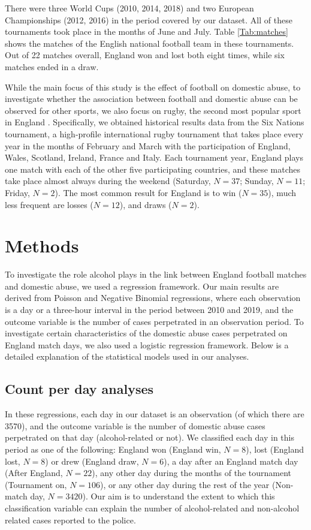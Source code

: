 \documentclass[12pt, a4paper]{article}
\begin{document}
 There were three World Cups (2010, 2014, 2018) and two European Championships (2012, 2016) in the period covered by our dataset. All of these tournaments took place in the months of June and July. 
Table \ref{Tab:matches} shows the matches of the English national football team in these tournaments. Out of 22 matches overall, England won and lost both eight times, while six matches ended in a draw. 

While the main focus of this study is the effect of football on domestic abuse, to investigate whether the association between football and domestic abuse can be observed for other sports, we also focus on rugby, the second most popular sport in England \cite{Ipsos2003}. Specifically, we obtained historical results data from the Six Nations tournament, a high-profile international rugby tournament that takes place every year in the months of February and March with the participation of England, Wales, Scotland, Ireland, France and Italy. Each tournament year, England plays one match with each of the other five participating countries, and these matches take place almost always during the weekend (Saturday, $N = 37$; Sunday, $N = 11$; Friday, $N = 2$). The most common result for England is to win ($N = 35$), much less frequent are losses ($N = 12$), and draws ($N = 2$).

\section{Methods}


To investigate the role alcohol plays in the link between England football matches and domestic abuse, we used a regression framework. Our main results are derived from Poisson and Negative Binomial regressions, where each observation is a day or a three-hour interval in the period between 2010 and 2019, and the outcome variable is the number of cases perpetrated in an observation period. To investigate certain characteristics of the domestic abuse cases perpetrated on England match days, we also used a logistic regression framework. Below is a detailed explanation of the statistical models used in our analyses.  


\subsection{Count per day analyses} 
\label{modelsexplained}


In these regressions, each day in our dataset is an observation (of which there are 3570), and the outcome variable is the number of domestic abuse cases perpetrated on that day (alcohol-related or not). We classified each day in this period as one of the following: England won (England win, $N = 8$), lost (England lost, $N = 8$) or drew (England draw, $N = 6$), a day after an England match day (After England, $N = 22$), any other day during the months of the tournament (Tournament on, $N = 106$), or any other day during the rest of the year (Non-match day, $N = 3420$). Our aim is to understand the extent to which this classification variable can explain the number of alcohol-related and non-alcohol related cases reported to the police.
\end{document}
